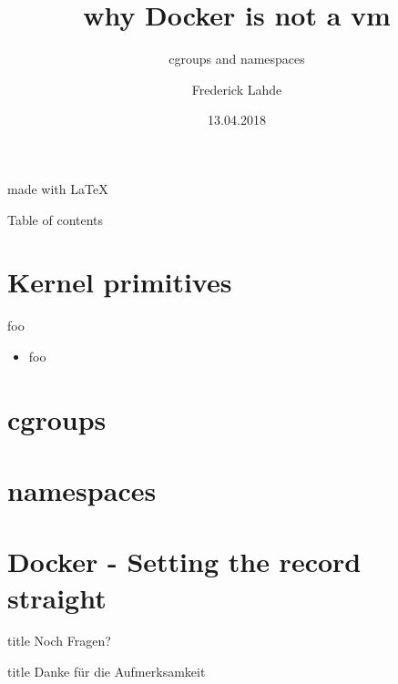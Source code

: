 \documentclass[14pt]{beamer}
\author{
    Frederick Lahde
  }
\title[]{why Docker is not a vm}
\subtitle{cgroups and namespaces}
\institute{Hochschule Emden/Leer}
\date{13.04.2018}
\begin{document}
    \begin{frame}[plain]
      \maketitle
      \centering
      \begin{figure}[H]
      \end{figure}
      \tiny{made with \LaTeX}
    \end{frame}
  
    \begin{frame}{Table of contents}
      \setcounter{tocdepth}{1}
      \tableofcontents
    \end{frame}
  

    \section{Kernel primitives}
    \begin{frame}{foo}
      \begin{itemize}
        \item foo
      \end{itemize}
    \end{frame}
    
    \section{cgroups}
    \section{namespaces}
    \section{Docker - Setting the record straight}


    \begin{frame}
      \vfill
      \centering
      \begin{beamercolorbox}[sep=8pt,center,shadow=true,rounded=true]{title}
        Noch Fragen?
      \end{beamercolorbox}
      \vfill
    \end{frame}
  
    \begin{frame}
      \vfill
      \centering
      \begin{beamercolorbox}[sep=8pt,center,shadow=true,rounded=true]{title}
        Danke für die Aufmerksamkeit
      \end{beamercolorbox}
      \vfill
    \end{frame}
  
\end{document}
